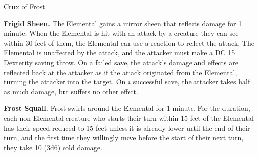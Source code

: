 \documentclass[10pt,a4paper,twoside,bg=print,twocolumn,openany,nodeprecatedcode]{dndbook}
\begin{document}
\begin{DndMonster}[float=t]{Crux of Frost}
\begin{description}
\item \textbf{Frigid Sheen.} The Elemental gains a mirror sheen that reflects damage for 1 minute. When the Elemental is hit with an attack by a creature they can see within 30 feet of them, the Elemental can use a reaction to reflect the attack. The Elemental is unaffected by the attack, and the attacker must make a DC 15 Dexterity saving throw. On a failed save, the attack's damage and effects are reflected back at the attacker as if the attack originated from the Elemental, turning the attacker into the target. On a successful save, the attacker takes half as much damage, but suffers no other effect.
\item \textbf{Frost Squall.} Frost swirls around the Elemental for 1 minute. For the duration, each non-Elemental creature who starts their turn within 15 feet of the Elemental has their speed reduced to 15 feet unless it is already lower until the end of their turn, and the first time they willingly move before the start of their next turn, they take 10 (3d6) cold damage.
\end{description}

\end{DndMonster}
\end{document}
